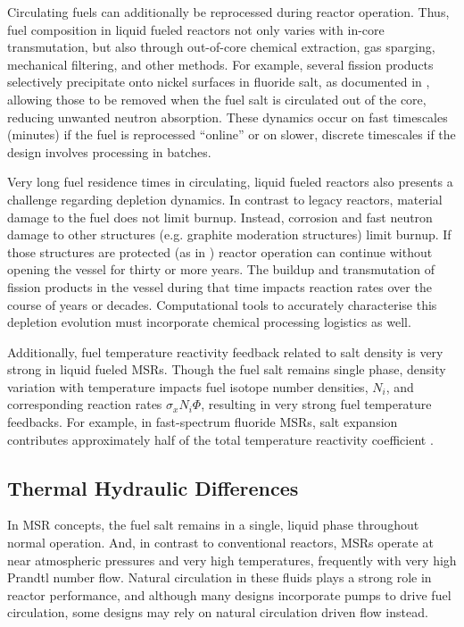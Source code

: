 Circulating fuels can additionally be reprocessed during reactor operation. 
Thus, fuel composition in liquid fueled reactors not only varies with in-core 
transmutation, but also through out-of-core chemical extraction, gas sparging, mechanical 
filtering, and other methods. For example, several fission products selectively 
precipitate onto nickel surfaces in fluoride salt, as documented in 
\cite{engel_conceptual_1980}, allowing those to be removed when the fuel salt is 
circulated out of the core, reducing unwanted neutron absorption. 
These dynamics occur on fast timescales (minutes) if the fuel is reprocessed 
``online'' or on slower, discrete timescales if the design involves processing 
in batches.

Very long fuel residence times in circulating, liquid fueled reactors also 
presents a challenge regarding depletion dynamics. In contrast to legacy 
reactors, material damage to the fuel does not limit burnup. Instead, corrosion 
and fast neutron damage to other structures (e.g.  graphite moderation 
structures) limit burnup.  If those structures are protected (as in 
\cite{engel_conceptual_1980}) reactor operation can continue without opening 
the vessel for thirty or more years. The buildup and transmutation of fission 
products in the vessel during that time impacts reaction rates over the course 
of years or decades. Computational tools to accurately characterise this 
depletion evolution must incorporate chemical processing logistics as well.

Additionally, fuel temperature reactivity feedback related to salt density is 
very strong in liquid fueled \glspl{MSR}. Though the fuel salt remains single phase, 
density variation with temperature impacts fuel isotope number densities, 
$N_i$, and corresponding reaction rates $\sigma_xN_i\Phi$, resulting in very 
strong fuel temperature feedbacks. For example, in fast-spectrum fluoride 
\glspl{MSR}, salt expansion contributes approximately half of the total 
temperature reactivity coefficient \cite{aufiero_monte_2017}.

\subsection{Thermal Hydraulic Differences}

In \gls{MSR} concepts, the fuel salt remains in a single, liquid phase throughout 
normal operation. 
And, in contrast to conventional reactors, \glspl{MSR} operate at near 
atmospheric pressures and very high temperatures, frequently with very high 
Prandtl number flow. Natural circulation in these 
fluids plays a strong role in reactor performance, and although many designs 
incorporate pumps to drive fuel circulation, some designs may rely on natural 
circulation driven flow instead.

